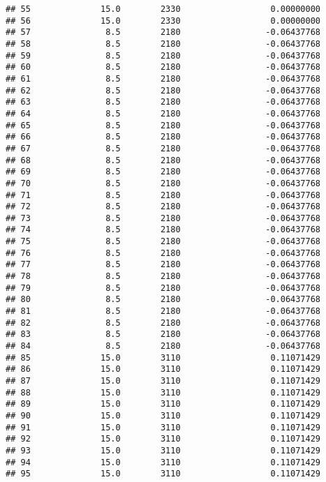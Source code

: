 \documentclass[]{article}
\begin{document}
\begin{verbatim}
## 55              15.0        2330                  0.00000000
## 56              15.0        2330                  0.00000000
## 57               8.5        2180                 -0.06437768
## 58               8.5        2180                 -0.06437768
## 59               8.5        2180                 -0.06437768
## 60               8.5        2180                 -0.06437768
## 61               8.5        2180                 -0.06437768
## 62               8.5        2180                 -0.06437768
## 63               8.5        2180                 -0.06437768
## 64               8.5        2180                 -0.06437768
## 65               8.5        2180                 -0.06437768
## 66               8.5        2180                 -0.06437768
## 67               8.5        2180                 -0.06437768
## 68               8.5        2180                 -0.06437768
## 69               8.5        2180                 -0.06437768
## 70               8.5        2180                 -0.06437768
## 71               8.5        2180                 -0.06437768
## 72               8.5        2180                 -0.06437768
## 73               8.5        2180                 -0.06437768
## 74               8.5        2180                 -0.06437768
## 75               8.5        2180                 -0.06437768
## 76               8.5        2180                 -0.06437768
## 77               8.5        2180                 -0.06437768
## 78               8.5        2180                 -0.06437768
## 79               8.5        2180                 -0.06437768
## 80               8.5        2180                 -0.06437768
## 81               8.5        2180                 -0.06437768
## 82               8.5        2180                 -0.06437768
## 83               8.5        2180                 -0.06437768
## 84               8.5        2180                 -0.06437768
## 85              15.0        3110                  0.11071429
## 86              15.0        3110                  0.11071429
## 87              15.0        3110                  0.11071429
## 88              15.0        3110                  0.11071429
## 89              15.0        3110                  0.11071429
## 90              15.0        3110                  0.11071429
## 91              15.0        3110                  0.11071429
## 92              15.0        3110                  0.11071429
## 93              15.0        3110                  0.11071429
## 94              15.0        3110                  0.11071429
## 95              15.0        3110                  0.11071429

\end{verbatim}
\end{document}
